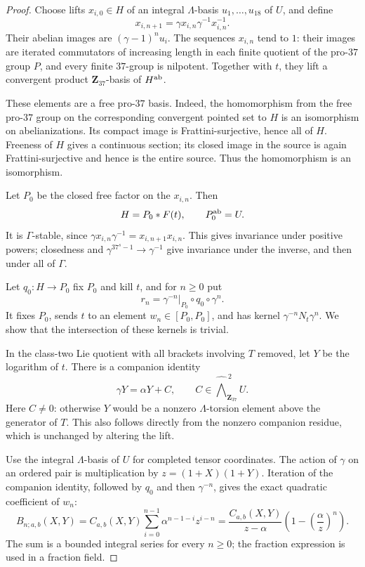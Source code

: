\documentclass[11pt]{article}
\theoremstyle{definition}\newtheorem{definition}[theorem]{Definition}
\begin{document}
\begin{proof}
Choose lifts \(x_{i,0}\in H\) of an integral \(\Lambda\)-basis
\(u_1,\ldots,u_{18}\) of \(U\), and define
\[
 x_{i,n+1}=\gamma x_{i,n}\gamma^{-1}x_{i,n}^{-1}.
\]
Their abelian images are \((\gamma-1)^nu_i\).
The sequences \(x_{i,n}\) tend to \(1\): their images are
iterated commutators of increasing length in each finite
quotient of the pro-\(37\) group \(P\), and every finite
\(37\)-group is nilpotent.
Together with \(t\), they lift a convergent product
\(\mathbf Z_{37}\)-basis of \(H^{\rm ab}\).

These elements are a free pro-\(37\) basis. Indeed, the
homomorphism from the free pro-\(37\) group on the corresponding
convergent pointed set to \(H\) is an isomorphism on
abelianizations. Its compact image is Frattini-surjective,
hence all of \(H\). Freeness of \(H\) gives a continuous
section; its closed image in the source is again
Frattini-surjective and hence is the entire source.
Thus the homomorphism is an isomorphism.

Let \(P_0\) be the closed free factor on the \(x_{i,n}\).
Then
\[
 H=P_0*F(t),\qquad P_0^{\rm ab}=U.
\]
It is \(\Gamma\)-stable, since
\(\gamma x_{i,n}\gamma^{-1}=x_{i,n+1}x_{i,n}\).
This gives invariance under positive powers; closedness and
\(\gamma^{37^s-1}\to\gamma^{-1}\) give invariance under the
inverse, and then under all of \(\Gamma\).

Let \(q_0:H\to P_0\) fix \(P_0\) and kill \(t\), and for
\(n\ge0\) put
\[
 r_n=\gamma^{-n}|_{P_0}\circ q_0\circ\gamma^n.
\]
It fixes \(P_0\), sends \(t\) to an element \(w_n\in[P_0,P_0]\),
and has kernel \(\gamma^{-n}N_t\gamma^n\).
We show that the intersection of these kernels is trivial.

In the class-two Lie quotient with all brackets involving
\(T\) removed, let \(Y\) be the logarithm of \(t\).
There is a companion identity
\[
 \gamma Y=\alpha Y+C,\qquad
 C\in\widehat{\bigwedge}^{\,2}_{\mathbf Z_{37}}U.
\]
Here \(C\ne0\): otherwise \(Y\) would be a nonzero
\(\Lambda\)-torsion element above the generator of \(T\).
This also follows directly from the nonzero companion
residue, which is unchanged by altering the lift.

Use the integral \(\Lambda\)-basis of \(U\) for completed
tensor coordinates. The action of \(\gamma\) on an ordered
pair is multiplication by \(z=(1+X)(1+Y)\).
Iteration of the companion identity, followed by \(q_0\)
and then \(\gamma^{-n}\), gives the exact quadratic
coefficient of \(w_n\):
\[
 B_{n;a,b}(X,Y)
 =C_{a,b}(X,Y)\sum_{i=0}^{n-1}\alpha^{n-1-i}z^{i-n}
 =\frac{C_{a,b}(X,Y)}{z-\alpha}
       \left(1-\left(\frac{\alpha}{z}\right)^n\right).
                                                        \tag{*}
\]
The sum is a bounded integral series for every \(n\ge0\);
the fraction expression is used in a fraction field.


\end{proof}
\end{document}
